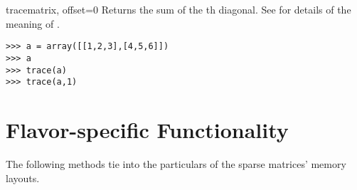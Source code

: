 \begin{funcdesc}{trace}{matrix, offset=0}
  Returns the sum of the th diagonal. See 
  for details of the meaning of .
\begin{verbatim}
>>> a = array([[1,2,3],[4,5,6]])
>>> a
>>> trace(a)
>>> trace(a,1)
\end{verbatim}
\end{funcdesc}
\section{Flavor-specific Functionality}

The following methods tie into the particulars of the sparse matrices'
memory layouts.

